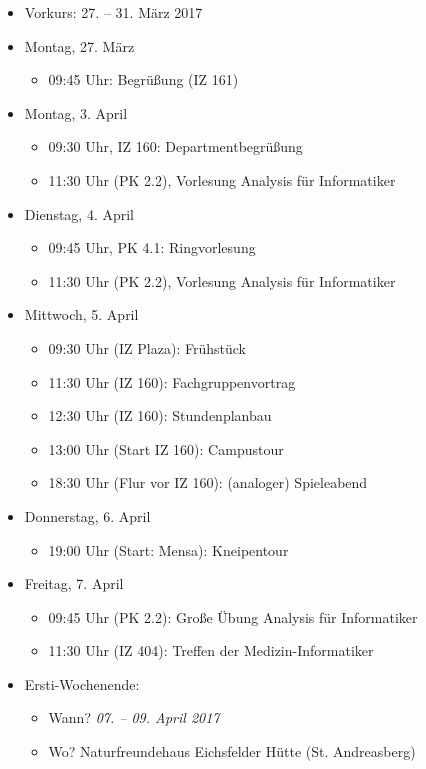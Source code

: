 \begin{itemize}
	\item Vorkurs: 27. – 31. März 2017
	\item Montag, 27. März
	\begin{itemize}
		\item 09:45 Uhr: Begrüßung (IZ 161)
	\end{itemize}
	\item Montag, 3. April
	\begin{itemize}
		\item 09:30 Uhr, IZ 160: Departmentbegrüßung
		\item 11:30 Uhr (PK 2.2), Vorlesung Analysis für Informatiker
	\end{itemize}
	\item Dienstag, 4. April
	\begin{itemize}
		\item 09:45 Uhr, PK 4.1: Ringvorlesung
		\item 11:30 Uhr (PK 2.2), Vorlesung Analysis für Informatiker
	\end{itemize}
	\item Mittwoch, 5. April
	\begin{itemize}
		\item 09:30 Uhr (IZ Plaza): Frühstück
		\item 11:30 Uhr (IZ 160): Fachgruppenvortrag
		\item 12:30 Uhr (IZ 160): Stundenplanbau
		\item 13:00 Uhr (Start IZ 160): Campustour
		\item 18:30 Uhr (Flur vor IZ 160): (analoger) Spieleabend
	\end{itemize}
	\item Donnerstag, 6. April
	\begin{itemize}
		\item 19:00 Uhr (Start: Mensa): Kneipentour
	\end{itemize}
	\item Freitag, 7. April
	\begin{itemize}
		\item 09:45 Uhr (PK 2.2): Große Übung Analysis für Informatiker
		\item 11:30 Uhr (IZ 404): Treffen der Medizin-Informatiker
	\end{itemize}
	\item Ersti-Wochenende:
	\begin{itemize}
		\item Wann? \emph{07. – 09. April 2017}
		\item Wo? Naturfreundehaus Eichsfelder Hütte (St. Andreasberg)

\end{itemize}
\end{itemize}
